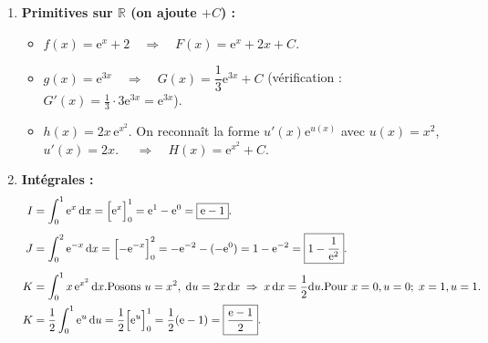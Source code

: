 \documentclass[11pt]{article}
\begin{document}
\begin{corrige}
\begin{enumerate}
\item \textbf{Primitives sur $\mathbb{R}$ (on ajoute $+C$) :}
  \begin{itemize}
  \item $f(x)=\mathrm{e}^{x}+2 \quad\Rightarrow\quad F(x) = \mathrm{e}^{x} + 2x + C$.
  \item $g(x)=\mathrm{e}^{3x} \quad\Rightarrow\quad G(x) = \dfrac{1}{3}\mathrm{e}^{3x} + C$ (vérification : $G'(x)=\frac{1}{3}\cdot 3\mathrm{e}^{3x}=\mathrm{e}^{3x}$).
  \item $h(x)=2x\,\mathrm{e}^{x^{2}}$. On reconnaît la forme $u'(x)\mathrm{e}^{u(x)}$ avec $u(x)=x^{2}$, $u'(x)=2x$.
        $\quad\Rightarrow\quad H(x) = \mathrm{e}^{x^{2}} + C$.
  \end{itemize}
\item \textbf{Intégrales :}
  \begin{align*}
  I &= \int_{0}^{1}\mathrm{e}^{x}\,\mathrm{d}x = \Bigl[\mathrm{e}^{x}\Bigr]_{0}^{1} = \mathrm{e}^{1} - \mathrm{e}^{0} = \boxed{\mathrm{e} - 1}. \\[4pt]
  J &= \int_{0}^{2}\mathrm{e}^{-x}\,\mathrm{d}x = \Bigl[-\mathrm{e}^{-x}\Bigr]_{0}^{2} = -\mathrm{e}^{-2} - (-\mathrm{e}^{0}) = 1 - \mathrm{e}^{-2} = \boxed{1 - \frac{1}{\mathrm{e}^{2}}}. \\[4pt]
  K &= \int_{0}^{1}x\,\mathrm{e}^{x^{2}}\,\mathrm{d}x.
      \text{Posons } u = x^{2},\; \mathrm{d}u = 2x\,\mathrm{d}x \;\Rightarrow\; x\,\mathrm{d}x = \frac{1}{2}\mathrm{d}u.
      \text{Pour } x=0, u=0;\; x=1, u=1. \\
      K &= \frac{1}{2}\int_{0}^{1}\mathrm{e}^{u}\,\mathrm{d}u = \frac{1}{2}\Bigl[\mathrm{e}^{u}\Bigr]_{0}^{1} = \frac{1}{2}(\mathrm{e} - 1) = \boxed{\frac{\mathrm{e}-1}{2}}.
  \end{align*}
\end{enumerate}
\end{corrige}
\end{document}

